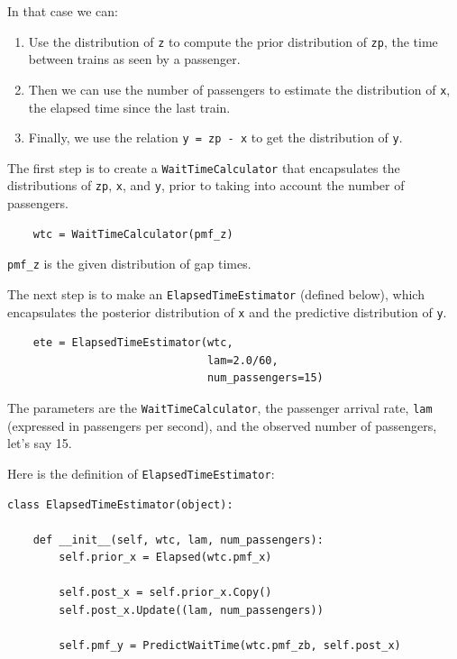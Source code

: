 \documentclass[12pt]{book}
\begin{document}
In that case we can:

\begin{enumerate}

\item Use the distribution of {\tt z} to compute
the prior distribution of {\tt zp}, the time between trains
as seen by a passenger.

\item Then we can use the number of passengers to estimate the distribution
of {\tt x}, the elapsed time since the last train.

\item Finally, we use the relation {\tt y = zp - x} to get the
distribution of {\tt y}.

\end{enumerate}

The first step is to create a {\tt WaitTimeCalculator} that
encapsulates the distributions of {\tt zp}, {\tt x},
and {\tt y}, prior to taking into account the number of
passengers.

\begin{verbatim}
    wtc = WaitTimeCalculator(pmf_z)
\end{verbatim}

\verb"pmf_z" is the given distribution of gap times.

The next step is to make an {\tt ElapsedTimeEstimator} (defined
below), which encapsulates the posterior distribution of {\tt x} and
the predictive distribution of {\tt y}.

\begin{verbatim}
    ete = ElapsedTimeEstimator(wtc,
                               lam=2.0/60,
                               num_passengers=15)
\end{verbatim}

The parameters are the {\tt WaitTimeCalculator}, the passenger
arrival rate, {\tt lam} (expressed in passengers per second),
and the observed number of passengers, let's say 15.

Here is the definition of {\tt ElapsedTimeEstimator}:

\begin{verbatim}
class ElapsedTimeEstimator(object):

    def __init__(self, wtc, lam, num_passengers):
        self.prior_x = Elapsed(wtc.pmf_x)

        self.post_x = self.prior_x.Copy()
        self.post_x.Update((lam, num_passengers))

        self.pmf_y = PredictWaitTime(wtc.pmf_zb, self.post_x)
\end{verbatim}
\end{document}
